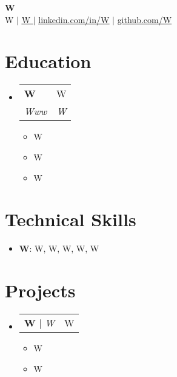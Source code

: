 \documentclass[letterpaper,11pt]{article}
\makeatletter
\newcommand{\resumeItem}[1]{
  \item\small{
    {#1 \vspace{-2pt}}
  }
}
\newcommand{\resumeSubheading}[4]{
  \vspace{-2pt}\item
    \begin{tabular*}{0.97\textwidth}[t]{l@{\extracolsep{\fill}}r}
      \textbf{#1} & #2 \\
      \textit{\small#3} & \textit{\small #4} \\
    \end{tabular*}\vspace{-7pt}
}
\newcommand{\resumeProjectHeading}[2]{
    \item
    \begin{tabular*}{0.97\textwidth}{l@{\extracolsep{\fill}}r}
      \small#1 & #2 \\
    \end{tabular*}\vspace{-7pt}
}
\newcommand{\resumeSubHeadingListStart}{\begin{itemize}[leftmargin=0.15in, label={}]}
\newcommand{\resumeSubHeadingListEnd}{\end{itemize}}
\newcommand{\resumeItemListStart}{\begin{itemize}}
\newcommand{\resumeItemListEnd}{\end{itemize}\vspace{-5pt}}
\makeatother
\begin{document}
\begin{center}
    \textbf{\Huge \scshape W } \\ \vspace{1pt}
    \small W $|$
    \href{mailto:W}{\underline{ W }} $|$
    \href{https://linkedin.com/in/W}{\underline{linkedin.com/in/W}} $|$
    \href{https://github.com/W}{\underline{github.com/W}}
\end{center}


\section{Education}
\resumeSubHeadingListStart

    \resumeSubheading
        { W }
        { W }
        { Www }
        { W }
    \resumeItemListStart
        
            \resumeItem{ W }
        
            \resumeItem{ W }
        
            \resumeItem{ W }
        
    \resumeItemListEnd

\resumeSubHeadingListEnd



\section{Technical Skills}
\resumeSubHeadingListStart

    \item
    {\textbf{ W}: W, W, W, W, W}

\resumeSubHeadingListEnd


\section{Projects}
\resumeSubHeadingListStart

\resumeProjectHeading
    {\textbf{ W } 
    \quad $|$ \quad 
    \emph{ W }}{ 
    W }
    \resumeItemListStart
        
        \resumeItem{ W }
        
        \resumeItem{ W }
        
    \resumeItemListEnd

\resumeSubHeadingListEnd

\end{document}
